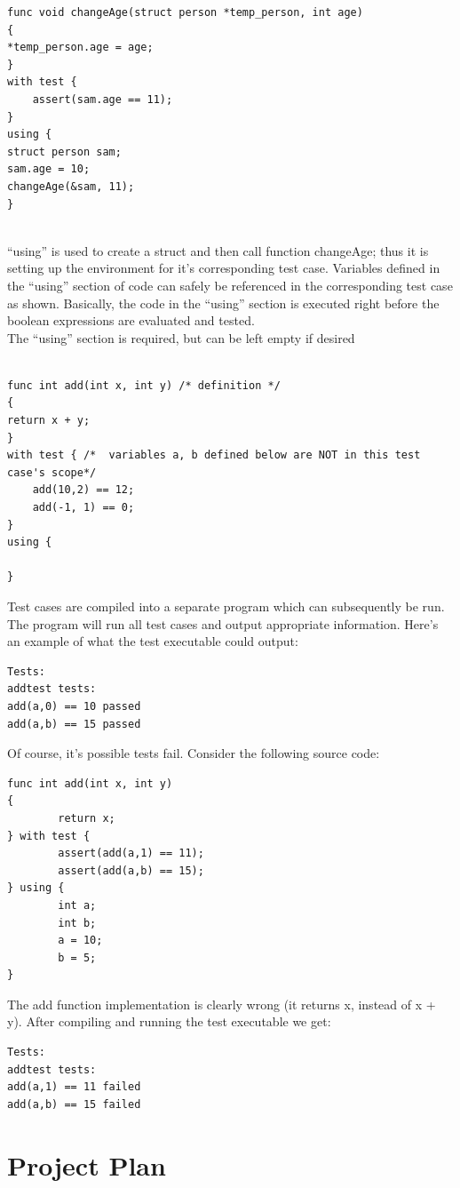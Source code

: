 \documentclass{article}
\begin{document}
\begin{lstlisting}
func void changeAge(struct person *temp_person, int age)
{
*temp_person.age = age;
}
with test {
	assert(sam.age == 11);
}
using {
struct person sam;
sam.age = 10;
changeAge(&sam, 11);
}


\end{lstlisting}


``using'' is used to create a struct and then call function changeAge; thus it is setting up the environment for it's corresponding test case. Variables defined in the ``using'' section of code can safely be referenced in the corresponding test case as shown. Basically, the code in the ``using'' section is executed right before the boolean expressions are evaluated and tested. \\
The ``using'' section is required, but can be left empty if desired

\begin{lstlisting}

func int add(int x, int y) /* definition */
{
return x + y;
}
with test { /*  variables a, b defined below are NOT in this test case's scope*/
	add(10,2) == 12;
	add(-1, 1) == 0;
}
using {
 
}

\end{lstlisting}

Test cases are compiled into a separate program which can subsequently be run. The program will run all test cases and output appropriate information. Here's an example of what the test executable could output:
\begin{lstlisting}
Tests:
addtest tests:
add(a,0) == 10 passed
add(a,b) == 15 passed
\end{lstlisting}
Of course, it's possible tests fail. Consider the following source code:
\begin{lstlisting}
func int add(int x, int y)
{
        return x;
} with test {
        assert(add(a,1) == 11);
        assert(add(a,b) == 15);
} using {
        int a;
        int b;
        a = 10;
        b = 5;
}
\end{lstlisting}
The add function implementation is clearly wrong (it returns x, instead of x + y). After compiling and running the test executable we get:
\begin{lstlisting}
Tests:
addtest tests:
add(a,1) == 11 failed
add(a,b) == 15 failed
\end{lstlisting}

\newpage

\section{Project Plan}
\end{document}
